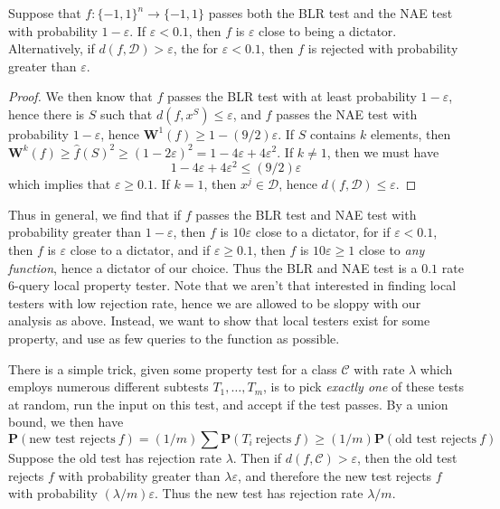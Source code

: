 \begin{theorem}
    Suppose that $f: \{ -1, 1 \}^n \to \{ -1, 1 \}$ passes both the BLR test and the NAE test with probability $1 - \varepsilon$. If $\varepsilon < 0.1$, then $f$ is $\varepsilon$ close to being a dictator. Alternatively, if $d(f,\mathcal{D}) > \varepsilon$, the for $\varepsilon < 0.1$, then $f$ is rejected with probability greater than $\varepsilon$.
\end{theorem}
\begin{proof}
    We then know that $f$ passes the BLR test with at least probability $1 - \varepsilon$, hence there is $S$ such that $d(f,x^S) \leq \varepsilon$, and $f$ passes the NAE test with probability $1 - \varepsilon$, hence $\mathbf{W}^1(f) \geq 1 - (9/2) \varepsilon$. If $S$ contains $k$ elements, then $\mathbf{W}^k(f) \geq \widehat{f}(S)^2 \geq (1 - 2\varepsilon)^2 = 1 - 4\varepsilon + 4\varepsilon^2$. If $k \neq 1$, then we must have
    \[ 1 - 4 \varepsilon + 4 \varepsilon^2 \leq (9/2) \varepsilon \]
    which implies that $\varepsilon \geq 0.1$. If $k = 1$, then $x^j \in \mathcal{D}$, hence $d(f,\mathcal{D}) \leq \varepsilon$.
\end{proof}

Thus in general, we find that if $f$ passes the BLR test and NAE test with probability greater than $1 - \varepsilon$, then $f$ is $10 \varepsilon$ close to a dictator, for if $\varepsilon < 0.1$, then $f$ is $\varepsilon$ close to a dictator, and if $\varepsilon \geq 0.1$, then $f$ is $10 \varepsilon \geq 1$ close to {\it any function}, hence a dictator of our choice. Thus the BLR and NAE test is a $0.1$ rate 6-query local property tester. Note that we aren't that interested in finding local testers with low rejection rate, hence we are allowed to be sloppy with our analysis as above. Instead, we want to show that local testers exist for some property, and use as few queries to the function as possible.

There is a simple trick, given some property test for a class $\mathcal{C}$ with rate $\lambda$ which employs numerous different subtests $T_1, \dots, T_m$, is to pick {\it exactly one} of these tests at random, run the input on this test, and accept if the test passes. By a union bound, we then have
%
\[ \mathbf{P}(\text{new test rejects}\ f) = (1/m) \sum \mathbf{P}(T_i\ \text{rejects}\ f) \geq (1/m) \mathbf{P}(\text{old test rejects}\ f) \]
%
Suppose the old test has rejection rate $\lambda$. Then if $d(f,\mathcal{C}) > \varepsilon$, then the old test rejects $f$ with probability greater than $\lambda \varepsilon$, and therefore the new test rejects $f$ with probability $(\lambda/m) \varepsilon$. Thus the new test has rejection rate $\lambda/m$.

